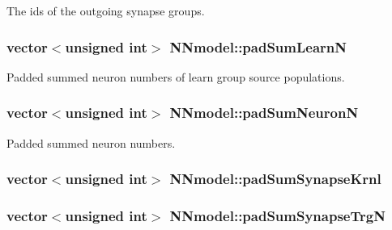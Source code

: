 The ids of the outgoing synapse groups. 

\hypertarget{classNNmodel_a2e6021bca44ea5ec0478e99cc6249295}{
\subsubsection[{pad\+Sum\+Learn\+N}]{\setlength{\rightskip}{0pt plus 5cm}vector$<$unsigned int$>$ N\+Nmodel\+::pad\+Sum\+Learn\+N}}\label{classNNmodel_a2e6021bca44ea5ec0478e99cc6249295}


Padded summed neuron numbers of learn group source populations. 

\hypertarget{classNNmodel_a08d284601fc39e164ca5aeac399d6a59}{
\subsubsection[{pad\+Sum\+Neuron\+N}]{\setlength{\rightskip}{0pt plus 5cm}vector$<$unsigned int$>$ N\+Nmodel\+::pad\+Sum\+Neuron\+N}}\label{classNNmodel_a08d284601fc39e164ca5aeac399d6a59}


Padded summed neuron numbers. 

\hypertarget{classNNmodel_a7c0e09e6fe2327601cc9b1e2e995b0e9}{
\subsubsection[{pad\+Sum\+Synapse\+Krnl}]{\setlength{\rightskip}{0pt plus 5cm}vector$<$unsigned int$>$ N\+Nmodel\+::pad\+Sum\+Synapse\+Krnl}}\label{classNNmodel_a7c0e09e6fe2327601cc9b1e2e995b0e9}
\hypertarget{classNNmodel_a73881a9d190c544cc6add9a19ee6a304}{
\subsubsection[{pad\+Sum\+Synapse\+Trg\+N}]{\setlength{\rightskip}{0pt plus 5cm}vector$<$unsigned int$>$ N\+Nmodel\+::pad\+Sum\+Synapse\+Trg\+N}}\label{classNNmodel_a73881a9d190c544cc6add9a19ee6a304}


